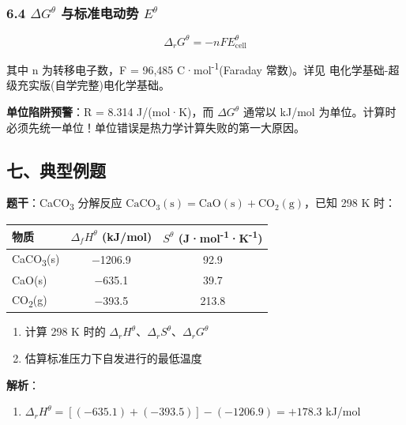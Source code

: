 \subsubsection{\texorpdfstring{6.4 \(\Delta G^\theta\) 与标准电动势 \(E^\theta\)}{6.4 \textbackslash Delta G\^{}\textbackslash theta 与标准电动势 E\^{}\textbackslash theta}}\label{delta-gtheta-ux4e0eux6807ux51c6ux7535ux52a8ux52bf-etheta}

\[
\Delta_r G^\theta = -nFE^\theta_{\text{cell}}
\]

其中 n 为转移电子数，F = 96,485 C·mol\textsuperscript{-1}(Faraday 常数)。详见 电化学基础-超级充实版(自学完整)\textbar 电化学基础。

\textbf{单位陷阱预警}：R = 8.314 J/(mol·K)，而 \(\Delta G^\theta\) 通常以 kJ/mol 为单位。计算时必须先统一单位！单位错误是热力学计算失败的第一大原因。

\subsection{七、典型例题}\label{ux4e03ux5178ux578bux4f8bux9898}

\textbf{题干}：CaCO\textsubscript{3} 分解反应 \(\mathrm{CaCO_3(s) = CaO(s) + CO_2(g)}\)，已知 298 K 时：

{\def\LTcaptype{none} %
\begin{longtable}[]{@{}lcc@{}}
\toprule\noalign{}
物质 & \(\Delta_f H^\theta\) (kJ/mol) & \(S^\theta\) (J·mol\textsuperscript{-1}·K\textsuperscript{-1}) \\
\midrule\noalign{}
\endhead
\bottomrule\noalign{}
\endlastfoot
CaCO\textsubscript{3}(s) & −1206.9 & 92.9 \\
CaO(s) & −635.1 & 39.7 \\
CO\textsubscript{2}(g) & −393.5 & 213.8 \\
\end{longtable}
}

\begin{enumerate}
\def\labelenumi{(\arabic{enumi})}
\tightlist
\item
  计算 298 K 时的 \(\Delta_r H^\theta\)、\(\Delta_r S^\theta\)、\(\Delta_r G^\theta\)
\item
  估算标准压力下自发进行的最低温度
\end{enumerate}

\textbf{解析}：

\begin{enumerate}
\def\labelenumi{(\arabic{enumi})}
\tightlist
\item
  \(\Delta_r H^\theta = [(-635.1) + (-393.5)] - (-1206.9) = +178.3\) kJ/mol
\end{enumerate}

